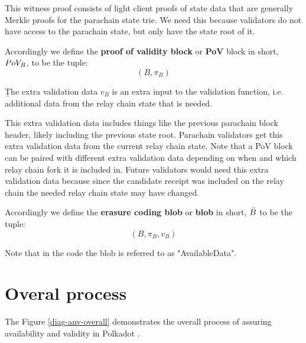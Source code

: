 This witness proof consists of light client proofs of state data that are generally Merkle proofs for the parachain state trie.  We need this because validators do not have access to the parachain state, but only have the state root of it.

\begin{definition}
  \label{defn-pov-block}
  Accordingly we define the {\bf proof of validity block} or {\bf PoV} block in
  short, {\bf $PoV_B$}, to be the tuple:
  \[
  (B, \pi_B)
  \]
\end{definition}

\begin{definition}  \label{defn-extra-validation-data}
  {\b The extra validation data} $v_B$  is an extra input to the validation function, i.e. additional data from the relay chain state that is needed.
\end{definition}
This extra validation data includes things like the previous parachain block header, likely including the previous state root.
Parachain validators get this extra validation data from the current relay chain state. Note that a PoV block can be paired with different extra validation data depending on when and which relay chain fork it is included in. Future validators would need this extra validation data because since the candidate receipt was included on the relay chain the needed relay chain state may have changed.

\begin{definition}
  \label{defn-blob}
  Accordingly we define the {\bf erasure coding blob} or {\bf blob} in short, {\bf $\bar{B}$} to be the tuple:
  \[
  (B, \pi_B, v_B)
  \]
\end{definition}

Note that in the code the blob is referred to as "AvailableData".


\section{Overal process}

The Figure \ref{diag-anv-overall} demonstrates the overall process of assuring availability and validity in Polkadot .

